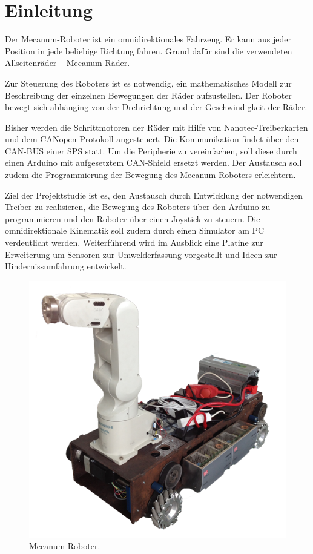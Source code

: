 
\section{Einleitung}

Der Mecanum-Roboter ist ein omnidirektionales Fahrzeug. Er kann aus jeder Position in jede beliebige Richtung fahren. Grund dafür sind die verwendeten Allseitenräder -- Mecanum-Räder. 

Zur Steuerung des Roboters ist es notwendig, ein mathematisches Modell zur Beschreibung der einzelnen Bewegungen der Räder aufzustellen.
Der Roboter bewegt sich abhänging von der Drehrichtung und der Geschwindigkeit der Räder.

Bisher werden die Schrittmotoren der Räder mit Hilfe von Nanotec-Treiberkarten und dem CANopen Protokoll angesteuert. Die Kommunikation findet über den CAN-BUS einer SPS statt. Um die Peripherie zu vereinfachen, soll diese durch einen Arduino mit aufgesetztem CAN-Shield ersetzt werden. Der Austausch soll zudem die Programmierung der Bewegung des Mecanum-Roboters erleichtern.

Ziel der Projektstudie ist es, den Austausch durch Entwicklung der notwendigen Treiber zu realisieren, die Bewegung des Roboters über den Arduino zu programmieren und den Roboter über einen Joystick zu steuern. Die omnidirektionale Kinematik soll zudem durch einen Simulator am PC verdeutlicht werden.
Weiterführend wird im Ausblick eine Platine zur Erweiterung um Sensoren zur Umwelderfassung vorgestellt und Ideen zur Hindernissumfahrung entwickelt.

\newpage
\begin{figure}[H]
\centering
 \includegraphics[width=.6\textwidth]{Abbildungen/Roboter} 
\caption[Mecanum-Roboter]{Mecanum-Roboter.}
\label{fig:Roboter}
\end{figure}


